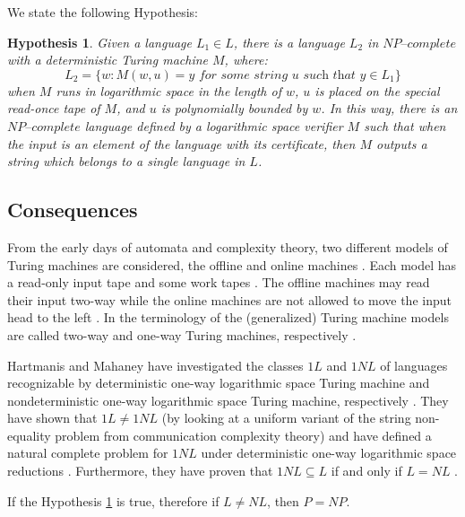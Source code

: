 \documentclass[a4paper,UKenglish,cleveref, autoref]{lipics-v2019}
\newtheorem{hypothesis}[theorem]{Hypothesis}
\begin{document}
We state the following Hypothesis:

\begin{hypothesis}
\label{hypothesis}
Given a language $L_{1} \in L$, there is a language $L_{2}$ in $\textit{NP--complete}$ with a deterministic Turing machine $M$, where:
\[L_{2} = \{w: M(w, u) = y \textit{ for some string } u \textit{ such that } y \in L_{1}\}\]
when $M$ runs in logarithmic space in the length of $w$, $u$ is placed on the special read-once tape of $M$, and $u$ is polynomially bounded by $w$. In this way, there is an $\textit{NP--complete}$ language defined by a logarithmic space verifier $M$ such that when the input is an element of the language with its certificate, then $M$ outputs a string which belongs to a single language in $L$.
\end{hypothesis}

\subsection{Consequences}

From the early days of automata and complexity  theory,  two  different  models  of  Turing  machines  are  considered, the offline and online machines \cite{KU15}. Each model has a read-only input tape and some work tapes \cite{KU15}. The offline machines may read their input two-way while the online machines are not allowed to move the input head to the left \cite{KU15}. In the terminology of the (generalized) Turing machine models are called two-way and one-way Turing machines, respectively \cite{KU15}.

Hartmanis and Mahaney have investigated the classes $1L$ and $1NL$ of languages recognizable by deterministic one-way logarithmic space Turing machine and nondeterministic one-way logarithmic space Turing machine, respectively \cite{HM81}. They have shown that $1L \neq 1NL$ (by looking at a uniform variant of the string non-equality problem from communication complexity theory) and have defined a natural complete problem for $1NL$ under deterministic one-way logarithmic space reductions \cite{HM81}. Furthermore, they have proven that $1NL \subseteq L$ if and only if $L=NL$ \cite{HM81}.

\begin{theorem}
\label{implication}
If the Hypothesis \ref{hypothesis} is true, therefore if $L \neq NL$, then $P = NP$.
\end{theorem}
\end{document}

